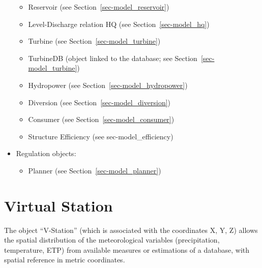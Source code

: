 \documentclass[
  letterpaper,
  DIV=11,
  numbers=noendperiod]{scrreprt}
\providecommand{\tightlist}{%
  \setlength{\itemsep}{0pt}\setlength{\parskip}{0pt}}\usepackage{longtable,booktabs,array}
\begin{document}
\begin{itemize}
  \begin{itemize}
  \item
    Reservoir (see Section~\ref{sec-model_reservoir})
  \item
    Level-Discharge relation HQ (see Section~\ref{sec-model_hq})
  \item
    Turbine (see Section~\ref{sec-model_turbine})
  \item
    TurbineDB (object linked to the database; see
    Section~\ref{sec-model_turbine})
  \item
    Hydropower (see Section~\ref{sec-model_hydropower})
  \item
    Diversion (see Section~\ref{sec-model_diversion})
  \item
    Consumer (see Section~\ref{sec-model_consumer})
  \item
    Structure Efficiency (see sec-model\_efficiency)
  \end{itemize}
\item
  Regulation objects:

  \begin{itemize}
  \tightlist
  \item
    Planner (see Section~\ref{sec-model_planner})
  \end{itemize}
\end{itemize}

\hypertarget{sec-virtual_station}{%
\chapter{Virtual Station}\label{sec-virtual_station}}

The object ``V-Station'' (which is associated with the coordinates X, Y,
Z) allows the spatial distribution of the meteorological variables
(precipitation, temperature, ETP) from available measures or estimations
of a database, with spatial reference in metric coordinates.
\end{document}
